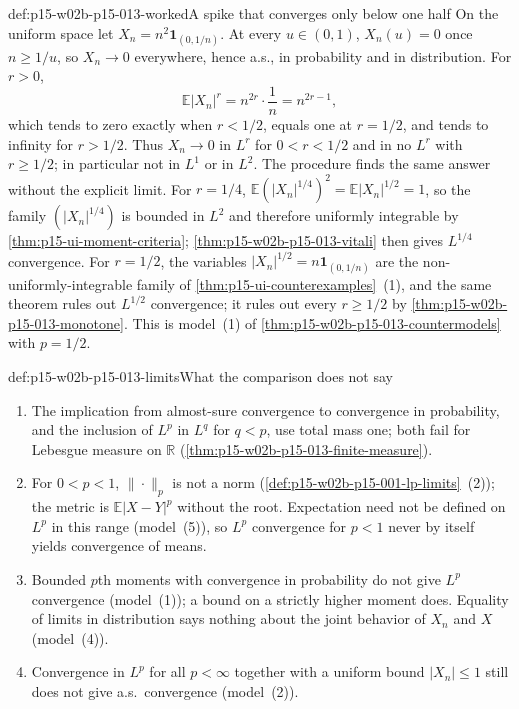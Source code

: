 \begin{hbexample}{def:p15-w02b-p15-013-worked}{A spike that converges only below one half}
On the uniform space let \(X_n=n^2\mathbf1_{(0,1/n)}\). At every
\(u\in(0,1)\), \(X_n(u)=0\) once \(n\geq1/u\), so \(X_n\to0\)
everywhere, hence a.s., in probability and in distribution. For
\(r>0\),
\[
 \mathbb E|X_n|^r=n^{2r}\cdot\frac1n=n^{2r-1},
\]
which tends to zero exactly when \(r<1/2\), equals one at \(r=1/2\),
and tends to infinity for \(r>1/2\). Thus \(X_n\to0\) in \(L^r\) for
\(0<r<1/2\) and in no \(L^r\) with \(r\geq1/2\); in particular not in
\(L^1\) or in \(L^2\). The procedure finds the same answer without the
explicit limit. For \(r=1/4\), \(\mathbb E(|X_n|^{1/4})^2=
\mathbb E|X_n|^{1/2}=1\), so the family \((|X_n|^{1/4})\) is bounded in
\(L^2\) and therefore uniformly integrable by
\cref{thm:p15-ui-moment-criteria}; \cref{thm:p15-w02b-p15-013-vitali}
then gives \(L^{1/4}\) convergence. For \(r=1/2\), the variables
\(|X_n|^{1/2}=n\mathbf1_{(0,1/n)}\) are the non-uniformly-integrable
family of \cref{thm:p15-ui-counterexamples}~(1), and the same theorem
rules out \(L^{1/2}\) convergence; it rules out every \(r\geq1/2\) by
\cref{thm:p15-w02b-p15-013-monotone}. This is model~(1) of
\cref{thm:p15-w02b-p15-013-countermodels} with \(p=1/2\).
\end{hbexample}

\begin{hbwarning}{def:p15-w02b-p15-013-limits}{What the comparison does not say}
\par\nobreak
\begin{enumerate}
\item The implication from almost-sure convergence to convergence in
      probability, and the inclusion of \(L^p\) in \(L^q\) for
      \(q<p\), use total mass one; both fail for Lebesgue measure on
      \(\mathbb R\) (\cref{thm:p15-w02b-p15-013-finite-measure}).
\item For \(0<p<1\), \(\|\cdot\|_p\) is not a norm
      (\cref{def:p15-w02b-p15-001-lp-limits}~(2)); the metric is
      \(\mathbb E|X-Y|^p\) without the root. Expectation need not be
      defined on \(L^p\) in this range (model~(5)), so
      \(L^p\) convergence for \(p<1\) never by itself yields convergence
      of means.
\item Bounded \(p\)th moments with convergence in probability do not
      give \(L^p\) convergence (model~(1)); a bound on a strictly higher
      moment does. Equality of limits in distribution says nothing about
      the joint behavior of \(X_n\) and \(X\) (model~(4)).
\item Convergence in \(L^p\) for all \(p<\infty\) together with a
      uniform bound \(|X_n|\leq1\) still does not give a.s.\
      convergence (model~(2)).
\end{enumerate}
\end{hbwarning}


